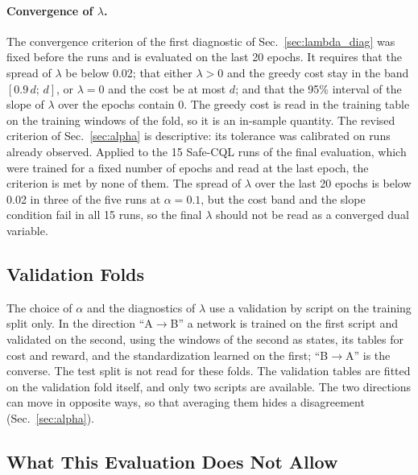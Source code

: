 \paragraph{Convergence of $\lambda$.}
The convergence criterion of the first diagnostic of Sec.~\ref{sec:lambda_diag} was fixed before the runs and is evaluated on the last 20 epochs.%
It requires that the spread of $\lambda$ be below 0.02; that either $\lambda>0$ and the greedy cost stay in the band $[0.9\,d;\,d]$, or $\lambda=0$ and the cost be at most $d$; and that the 95\% interval of the slope of $\lambda$ over the epochs contain 0.%
The greedy cost is read in the training table on the training windows of the fold, so it is an in-sample quantity.%
The revised criterion of Sec.~\ref{sec:alpha} is descriptive: its tolerance was calibrated on runs already observed.%
Applied to the 15 Safe-CQL runs of the final evaluation, which were trained for a fixed number of epochs and read at the last epoch, the criterion is met by none of them.%
The spread of $\lambda$ over the last 20 epochs is below 0.02 in three of the five runs at $\alpha=0.1$, but the cost band and the slope condition fail in all 15 runs, so the final $\lambda$ should not be read as a converged dual variable.%

\subsection{Validation Folds}
\label{sec:folds}

The choice of $\alpha$ and the diagnostics of $\lambda$ use a validation by script on the training split only.%
In the direction ``A$\to$B'' a network is trained on the first script and validated on the second, using the windows of the second as states, its tables for cost and reward, and the standardization learned on the first; ``B$\to$A'' is the converse.%
The test split is not read for these folds.%
The validation tables are fitted on the validation fold itself, and only two scripts are available.%
The two directions can move in opposite ways, so that averaging them hides a disagreement (Sec.~\ref{sec:alpha}).%

\subsection{What This Evaluation Does Not Allow}
\label{sec:limits_eval}

